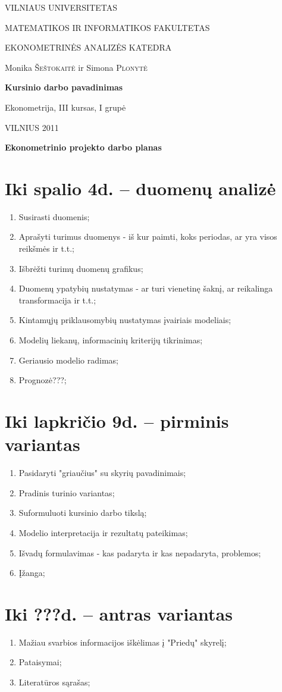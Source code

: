 \documentclass[a4paper]{article}
\begin{document}
\begin{titlepage}
\centerline{ \large VILNIAUS UNIVERSITETAS}
\bigskip
\centerline{\large MATEMATIKOS IR INFORMATIKOS FAKULTETAS}
\smallskip

\centerline{\large  EKONOMETRINĖS ANALIZĖS KATEDRA}
\vskip 200pt
\centerline{ \large Monika \textsc{Šeštokaitė} ir \large Simona \textsc{Plonytė}}
\vskip 50pt
\centerline{\bf \Large Kursinio darbo pavadinimas}
\bigskip
\vskip 50pt
\hfill Ekonometrija, III kursas, I grupė
\vskip 100pt
\centerline{\large VILNIUS 2011}
\end{titlepage}

\pagebreak

\centerline{\bf \Large Ekonometrinio projekto darbo planas}

\section{ Iki spalio 4d. -- duomenų analizė }


\begin{enumerate}
\item {Susirasti duomenis;}
\item {Aprašyti turimus duomenys - iš kur paimti, koks periodas, ar yra visos reikšmės ir t.t.;}
\item {Išbrėžti turimų duomenų grafikus;}
\item {Duomenų ypatybių nustatymas - ar turi vienetinę šaknį, ar reikalinga transformacija ir t.t.;}
\item {Kintamųjų priklausomybių nustatymas įvairiais modeliais;}
\item {Modelių liekanų, informacinių kriterijų tikrinimas;}
\item {Geriausio modelio radimas;}
\item {{\color{red} Prognozė???};}
\end{enumerate}


\section{ Iki lapkričio 9d. -- pirminis variantas}

\begin{enumerate}
\item {Pasidaryti "griaučius" su skyrių pavadinimais;}
\item {Pradinis turinio variantas;}
\item {Suformuluoti kursinio darbo tikslą;}
\item {Modelio interpretacija ir rezultatų pateikimas;}
\item {Išvadų formulavimas - kas padaryta ir kas nepadaryta, problemos;}
\item {Įžanga;}
\end{enumerate}


\section{{\color{red} Iki ???d.} -- antras variantas}

\begin{enumerate}
\item {Mažiau svarbios informacijos iškėlimas į "Priedų" skyrelį;}
\item {Pataisymai;}
\item {Literatūros sąrašas;}
\end{enumerate}
\end{document}
